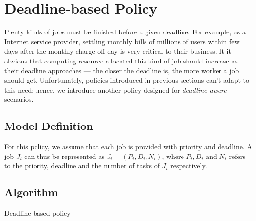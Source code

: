 \section{Deadline-based Policy}

Plenty kinds of jobs must be finished before a given deadline.
For example, as a Internet service provider, settling monthly bills of
millions of users within few days after the monthly charge-off day is
very critical to their business.
It it obvious that computing resource allocated this kind of job should
increase as their deadline approaches --- the closer the deadline is, the
more worker a job should get.
Unfortunately, policies introduced in previous sections can't adapt to
this need; hence, we introduce another policy designed for
\emph{deadline-aware} scenarios.

\subsection{Model Definition}

For this policy, we assume that each job is provided with priority and
deadline.
A job $J_i$ can thus be represented as $J_i = (P_i, D_i, N_i)$, where
$P_i, D_i\text{ and }N_i$ refers to the priority, deadline and the
number of tasks of $J_i$ respectively.


\subsection{Algorithm}

\begin{algorithm}[H]
  \DontPrintSemicolon %
  
  \caption{Deadline-based policy}
  \label{algo:deadline-based}
\end{algorithm}
